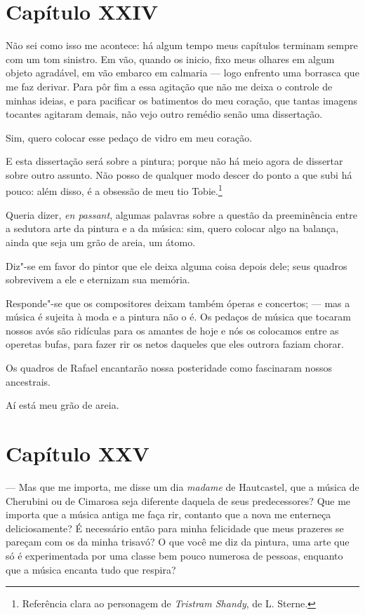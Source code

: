 \section*{Capítulo XXIV}

 Não sei como isso me acontece: há algum tempo meus capítulos terminam
sempre com um tom sinistro. Em vão, quando os inicio, fixo meus olhares
em algum objeto agradável, em vão embarco em calmaria --- logo
enfrento uma borrasca que me faz derivar. Para pôr fim a essa agitação
que não me deixa o controle de minhas ideias, e para pacificar os
batimentos do meu coração, que tantas imagens tocantes agitaram demais,
não vejo outro remédio senão uma dissertação.

Sim, quero colocar esse pedaço de vidro em meu coração.

E esta dissertação será sobre a pintura; porque não há meio agora de
dissertar sobre outro assunto. Não posso de qualquer modo descer do
ponto a que subi há pouco: além disso, é a obsessão de meu tio
Tobie.\footnote{ Referência clara ao personagem de \textit{Tristram
Shandy}, de L. Sterne.} 

Queria dizer, \textit{en passant}, algumas palavras sobre a questão da
preeminência entre a sedutora arte da pintura e a da música: sim, quero
colocar algo na balança, ainda que seja um grão de areia, um átomo.

Diz"-se em favor do pintor que ele deixa alguma coisa depois dele; seus
quadros sobrevivem a ele e eternizam sua memória. 

Responde"-se que os compositores deixam também óperas e concertos; ---
mas a música é sujeita à moda e a pintura não o é. Os pedaços de música
que tocaram nossos avós são ridículas para os amantes de hoje e nós os
colocamos entre as operetas bufas, para fazer rir os netos daqueles que
eles outrora faziam chorar.

Os quadros de Rafael encantarão nossa posteridade como fascinaram nossos
ancestrais.

Aí está meu grão de areia.

\section*{Capítulo XXV}

 --- Mas que me importa, me disse um dia \textit{madame} de Hautcastel,
que a música de Cherubini ou de Cimarosa seja diferente daquela de seus
predecessores? Que me importa que a música antiga me faça rir, contanto
que a nova me enterneça deliciosamente? É necessário então para minha
felicidade que meus prazeres se pareçam com os da minha trisavó? O que
você me diz da pintura, uma arte que só é experimentada por uma classe
bem pouco numerosa de pessoas, enquanto que a música encanta tudo que
respira?

